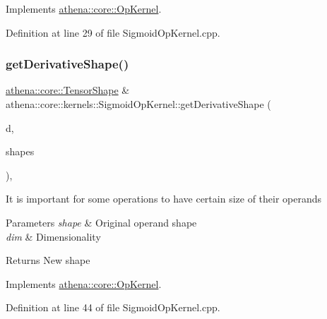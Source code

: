 Implements \mbox{\hyperlink{classathena_1_1core_1_1_op_kernel_ad500db1afc5a7c10acff8ecb8f1bee4d}{athena\+::core\+::\+Op\+Kernel}}.



Definition at line 29 of file Sigmoid\+Op\+Kernel.\+cpp.

\mbox{\label{classathena_1_1core_1_1kernels_1_1_sigmoid_op_kernel_a0ea18b43eb9355d7a855202898ff09fc}} 
\subsubsection{\texorpdfstring{get\+Derivative\+Shape()}{getDerivativeShape()}}
{\footnotesize\ttfamily \mbox{\hyperlink{classathena_1_1core_1_1_tensor_shape}{athena\+::core\+::\+Tensor\+Shape}} \& athena\+::core\+::kernels\+::\+Sigmoid\+Op\+Kernel\+::get\+Derivative\+Shape (\begin{DoxyParamCaption}\item[{int}]{d,  }\item[{std\+::vector$<$ \mbox{\hyperlink{classathena_1_1core_1_1_tensor_shape}{athena\+::core\+::\+Tensor\+Shape}} $>$ \&}]{shapes }\end{DoxyParamCaption})\hspace{0.3cm}{\ttfamily [override]}, {\ttfamily [virtual]}}

It is important for some operations to have certain size of their operands 
\begin{DoxyParams}{Parameters}
{\em shape} & Original operand shape \\
\hline
{\em dim} & Dimensionality \\
\hline
\end{DoxyParams}
\begin{DoxyReturn}{Returns}
New shape 
\end{DoxyReturn}


Implements \mbox{\hyperlink{classathena_1_1core_1_1_op_kernel_ad95af6dd184ce7ee9182ec7ca54b6c4d}{athena\+::core\+::\+Op\+Kernel}}.



Definition at line 44 of file Sigmoid\+Op\+Kernel.\+cpp.

